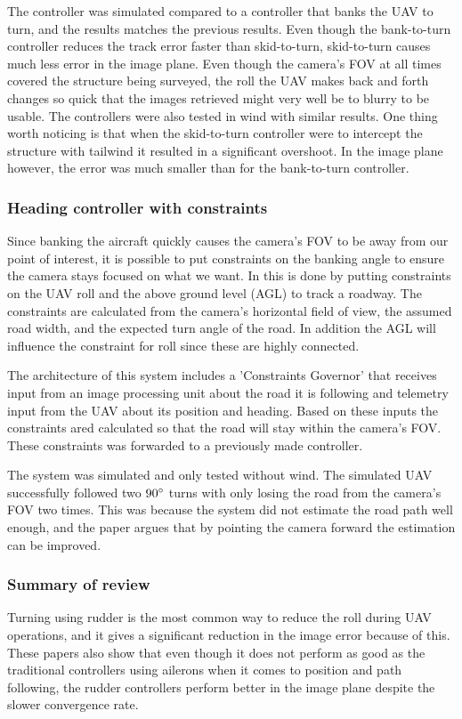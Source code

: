 The controller was simulated compared to a controller that banks the UAV to turn, and the results matches the previous results. Even though the bank-to-turn controller reduces the track error faster than skid-to-turn, skid-to-turn causes much less error in the image plane. Even though the camera's FOV at all times covered the structure being surveyed, the roll the UAV makes back and forth changes so quick that the images retrieved might very well be to blurry to be usable. The controllers were also tested in wind with similar results. One thing worth noticing is that when the skid-to-turn controller were to intercept the structure with tailwind it resulted in a significant overshoot. In the image plane however, the error was much smaller than for the bank-to-turn controller.


\subsubsection{Heading controller with constraints}
Since banking the aircraft quickly causes the camera's FOV to be away from our point of interest, it is possible to put constraints on the banking angle to ensure the camera stays focused on what we want. In \cite{constraintsEGBERT} this is done by putting constraints on the UAV roll and the above ground level (AGL) to track a roadway. The constraints are calculated from the camera's horizontal field of view, the assumed road width, and the expected turn angle of the road. In addition the AGL will influence the constraint for roll since these are highly connected.

The architecture of this system includes a 'Constraints Governor' that receives input from an image processing unit about the road it is following and telemetry input from the UAV about its position and heading. Based on these inputs the constraints ared calculated so that the road will stay within the camera's FOV. These constraints was forwarded to a previously made controller.

The system was simulated and only tested without wind. The simulated UAV successfully followed two $90 \degree$ turns with only losing the road from the camera's FOV two times. This was because the system did not estimate the road path well enough, and the paper argues that by pointing the camera forward the estimation can be improved.


\subsubsection{Summary of review}
Turning using rudder is the most common way to reduce the roll during UAV operations, and it gives a significant reduction in the image error because of this. These papers also show that even though it does not perform as good as the traditional controllers using ailerons when it comes to position and path following, the rudder controllers perform better in the image plane despite the slower convergence rate.

